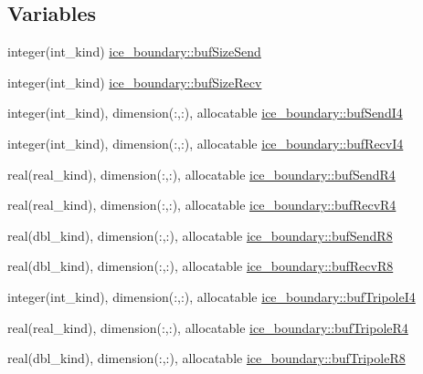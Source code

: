 \subsection*{Variables}
\begin{DoxyCompactItemize}
\item 
integer(int\_\-kind) \hyperlink{namespaceice__boundary_aa836a7146cb8129f59f4a457b5100c2c}{ice\_\-boundary::bufSizeSend}
\item 
integer(int\_\-kind) \hyperlink{namespaceice__boundary_a4faa8fff704b4598309e0cdb8a777032}{ice\_\-boundary::bufSizeRecv}
\item 
integer(int\_\-kind), dimension(:,:), allocatable \hyperlink{namespaceice__boundary_a2554f422dd4f1b67e0affadd17f11069}{ice\_\-boundary::bufSendI4}
\item 
integer(int\_\-kind), dimension(:,:), allocatable \hyperlink{namespaceice__boundary_a59b118d50a3fe964e4109999b54f432b}{ice\_\-boundary::bufRecvI4}
\item 
real(real\_\-kind), dimension(:,:), allocatable \hyperlink{namespaceice__boundary_a78f43d9e66420f40a9140762b7b69427}{ice\_\-boundary::bufSendR4}
\item 
real(real\_\-kind), dimension(:,:), allocatable \hyperlink{namespaceice__boundary_a9924032ec4c94a255c40c319d1577a08}{ice\_\-boundary::bufRecvR4}
\item 
real(dbl\_\-kind), dimension(:,:), allocatable \hyperlink{namespaceice__boundary_a6fd3fc7d61b1eb43afbd050a0d073c90}{ice\_\-boundary::bufSendR8}
\item 
real(dbl\_\-kind), dimension(:,:), allocatable \hyperlink{namespaceice__boundary_a8322278cdca5c48f9a5bad7118fcbecd}{ice\_\-boundary::bufRecvR8}
\item 
integer(int\_\-kind), dimension(:,:), allocatable \hyperlink{namespaceice__boundary_a3bcbb0d2bf24f90a72bbbedfd53ec6bd}{ice\_\-boundary::bufTripoleI4}
\item 
real(real\_\-kind), dimension(:,:), allocatable \hyperlink{namespaceice__boundary_a8d42883469648c0eef77bb2f2c830853}{ice\_\-boundary::bufTripoleR4}
\item 
real(dbl\_\-kind), dimension(:,:), allocatable \hyperlink{namespaceice__boundary_a0cf3692aba462080bcd506c8e2b56b21}{ice\_\-boundary::bufTripoleR8}
\end{DoxyCompactItemize}
